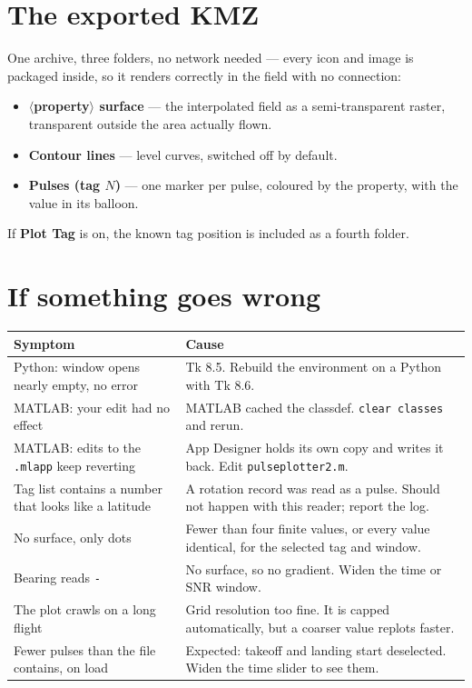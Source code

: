 \documentclass[11pt,a4paper]{article}
\newcommand{\code}[1]{\texttt{\small #1}}
\begin{document}
\section{The exported KMZ}

One archive, three folders, no network needed --- every icon and image is
packaged inside, so it renders correctly in the field with no connection:

\begin{itemize}
\item \textbf{$\langle$property$\rangle$ surface} --- the interpolated field as
      a semi-transparent raster, transparent outside the area actually flown.
\item \textbf{Contour lines} --- level curves, switched off by default.
\item \textbf{Pulses (tag $N$)} --- one marker per pulse, coloured by the
      property, with the value in its balloon.
\end{itemize}

\noindent If \textbf{Plot Tag} is on, the known tag position is included as a
fourth folder.

\section{If something goes wrong}

\begin{center}\small
\begin{tabular}{@{}p{}p{}@{}}
\toprule
Symptom & Cause \\
\midrule
Python: window opens nearly empty, no error &
  Tk 8.5. Rebuild the environment on a Python with Tk 8.6. \\
MATLAB: your edit had no effect &
  MATLAB cached the classdef. \code{clear classes} and rerun. \\
MATLAB: edits to the \code{.mlapp} keep reverting &
  App Designer holds its own copy and writes it back. Edit \code{pulseplotter2.m}. \\
Tag list contains a number that looks like a latitude &
  A rotation record was read as a pulse. Should not happen with this reader; report the log. \\
No surface, only dots &
  Fewer than four finite values, or every value identical, for the selected tag and window. \\
Bearing reads \code{-} &
  No surface, so no gradient. Widen the time or SNR window. \\
The plot crawls on a long flight &
  Grid resolution too fine. It is capped automatically, but a coarser value replots faster. \\
Fewer pulses than the file contains, on load &
  Expected: takeoff and landing start deselected. Widen the time slider to see them. \\
\bottomrule
\end{tabular}
\end{center}
\end{document}
